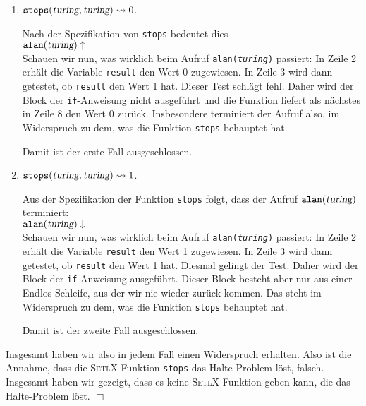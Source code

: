 \begin{enumerate}
\item $\mathtt{stops}(\textsl{turing}, \textsl{turing}) \leadsto 0$. 

      Nach der Spezifikation von \texttt{stops} bedeutet dies \\[0.1cm]
      \hspace*{1.3cm} $\mathtt{alan}(\textsl{turing}) \uparrow$ \\[0.1cm]
      Schauen wir nun, was wirklich beim Aufruf \texttt{alan(\textsl{turing})} passiert:
      In Zeile 2 erh\"alt die Variable \texttt{result} den Wert 0 zugewiesen.  In Zeile 3
      wird dann getestet, ob \texttt{result} den Wert 1 hat.  Dieser Test schl\"agt fehl.
      Daher wird der Block der \texttt{if}-Anweisung nicht ausgef\"uhrt und die Funktion liefert als
      n\"achstes in Zeile 8 den Wert 0 zur\"uck.  Insbesondere terminiert der Aufruf also, im
      Widerspruch zu dem, was die Funktion \texttt{stops} behauptet hat.

      Damit ist der erste Fall ausgeschlossen.
\item  $\mathtt{stops}(\textsl{turing}, \textsl{turing}) \leadsto 1$. 

      Aus der Spezifikation der Funktion \texttt{stops} folgt, dass der Aufruf
      $\mathtt{alan}(\textsl{turing})$ terminiert: \\[0.1cm]
      \hspace*{1.3cm} $\mathtt{alan}(\textsl{turing}) \downarrow$ \\[0.1cm]
      Schauen wir nun, was wirklich beim Aufruf \texttt{alan(\textsl{turing})} passiert:
      In Zeile 2 erh\"alt die Variable \texttt{result} den Wert 1 zugewiesen.  In Zeile 3
      wird dann getestet, ob \texttt{result} den Wert 1 hat.  Diesmal gelingt der Test.
      Daher wird der Block der \texttt{if}-Anweisung ausgef\"uhrt.  Dieser Block
      besteht aber nur aus einer Endlos-Schleife, aus der wir nie wieder zur\"uck kommen.
      Das steht im Widerspruch zu dem, was die Funktion \texttt{stops} behauptet hat.

      Damit ist der zweite Fall ausgeschlossen.
\end{enumerate}
Insgesamt haben wir also in jedem Fall einen Widerspruch erhalten.  
Also ist die Annahme, dass die \textsc{SetlX}-Funktion \texttt{stops}
das Halte-Problem l\"ost, falsch.  Insgesamt haben wir gezeigt, dass es keine \textsc{SetlX}-Funktion
geben kann, die das Halte-Problem l\"ost. \hspace*{\fill} $\Box$
\vspace*{0.3cm}

